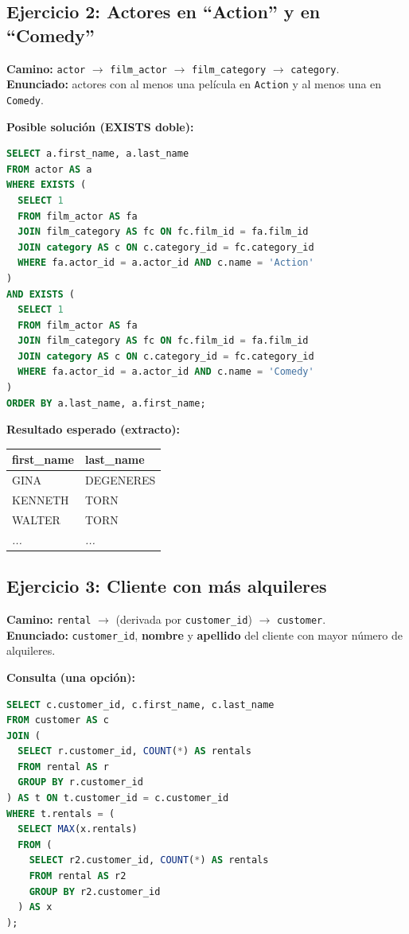 \documentclass[12pt,a4paper]{article}
\begin{document}
\subsection*{Ejercicio 2: Actores en ``Action'' y en ``Comedy''}
\textbf{Camino:} \texttt{actor} $\rightarrow$ \texttt{film\_actor} $\rightarrow$ \texttt{film\_category} $\rightarrow$ \texttt{category}. \\
\textbf{Enunciado:} actores con al menos una película en \texttt{Action} y al menos una en \texttt{Comedy}.

\textbf{Posible solución (EXISTS doble):}
\begin{lstlisting}[language=SQL]
SELECT a.first_name, a.last_name
FROM actor AS a
WHERE EXISTS (
  SELECT 1
  FROM film_actor AS fa
  JOIN film_category AS fc ON fc.film_id = fa.film_id
  JOIN category AS c ON c.category_id = fc.category_id
  WHERE fa.actor_id = a.actor_id AND c.name = 'Action'
)
AND EXISTS (
  SELECT 1
  FROM film_actor AS fa
  JOIN film_category AS fc ON fc.film_id = fa.film_id
  JOIN category AS c ON c.category_id = fc.category_id
  WHERE fa.actor_id = a.actor_id AND c.name = 'Comedy'
)
ORDER BY a.last_name, a.first_name;
\end{lstlisting}

\textbf{Resultado esperado (extracto):}
\begin{center}
\begin{tabular}{l l}
\hline
first\_name & last\_name \\
\hline
GINA    & DEGENERES \\
KENNETH & TORN \\
WALTER  & TORN \\
\textit{...} & \textit{...} \\
\hline
\end{tabular}
\end{center}

\subsection*{Ejercicio 3: Cliente con más alquileres}
\textbf{Camino:} \texttt{rental} $\rightarrow$ (derivada por \texttt{customer\_id}) $\rightarrow$ \texttt{customer}. \\
\textbf{Enunciado:} \texttt{customer\_id}, \textbf{nombre} y \textbf{apellido} del cliente con mayor número de alquileres.

\textbf{Consulta (una opción):}
\begin{lstlisting}[language=SQL]
SELECT c.customer_id, c.first_name, c.last_name
FROM customer AS c
JOIN (
  SELECT r.customer_id, COUNT(*) AS rentals
  FROM rental AS r
  GROUP BY r.customer_id
) AS t ON t.customer_id = c.customer_id
WHERE t.rentals = (
  SELECT MAX(x.rentals)
  FROM (
    SELECT r2.customer_id, COUNT(*) AS rentals
    FROM rental AS r2
    GROUP BY r2.customer_id
  ) AS x
);
\end{lstlisting}
\end{document}
